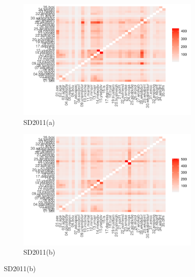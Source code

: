 \begin{figure}[ht]
  \caption{CTGAN two-way correlation (pMSE)}
  \label{fig:ctgan_fidelity_two_way}
  \centering

  \begin{subfigure}{0.75\textwidth}
    \includegraphics[width=\linewidth]{../graphs/ctgan/ctgan_fidelity_twoway_sd2011.pdf}
    \caption{SD2011(a)}
    \label{fig:ctgan_fidelity_two_way_subfig-a}
  \end{subfigure}

  \begin{subfigure}{0.75\textwidth}
    \includegraphics[width=\linewidth]{../graphs/ctgan/ctgan_fidelity_twoway_sd2011_clean.pdf}
    \caption{SD2011(b)}
    \label{fig:ctgan_fidelity_two_way_subfig-b}
  \end{subfigure}


\end{figure}

